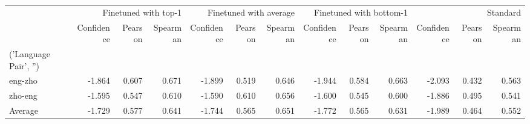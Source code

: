\begin{tabular}{lrrrrrrrrrrrr}
\toprule
 & \multicolumn{3}{r}{Finetuned with top-1} & \multicolumn{3}{r}{Finetuned with average} & \multicolumn{3}{r}{Finetuned with bottom-1} & \multicolumn{3}{r}{Standard} \\
 & Confidence & Pearson & Spearman & Confidence & Pearson & Spearman & Confidence & Pearson & Spearman & Confidence & Pearson & Spearman \\
('Language Pair', '') &  &  &  &  &  &  &  &  &  &  &  &  \\
\midrule
eng-zho & -1.864 & 0.607 & 0.671 & -1.899 & 0.519 & 0.646 & -1.944 & 0.584 & 0.663 & -2.093 & 0.432 & 0.563 \\
zho-eng & -1.595 & 0.547 & 0.610 & -1.590 & 0.610 & 0.656 & -1.600 & 0.545 & 0.600 & -1.886 & 0.495 & 0.541 \\
Average & -1.729 & 0.577 & 0.641 & -1.744 & 0.565 & 0.651 & -1.772 & 0.565 & 0.631 & -1.989 & 0.464 & 0.552 \\
\bottomrule
\end{tabular}
